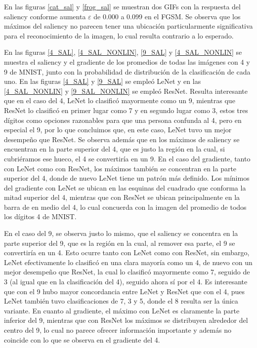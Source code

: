 En las figuras \ref{cat_sal} y \ref{frog_sal} se muestran dos GIFs con la respuesta del saliency conforme aumenta $\varepsilon$ de 0.000 a 0.099 en el FGSM. Se observa que los máximos del saliency no parecen tener una ubicación particularmente significativa para el reconocimiento de la imagen, lo cual resulta contrario a lo esperado.

En las figuras \ref{4_SAL}, \ref{4_SAL_NONLIN}, \ref{9_SAL} y \ref{4_SAL_NONLIN} se muestra el saliency y el gradiente de los promedios de todas las imágenes con 4 y 9 de MNIST, junto con la probabilidad de distribución de la clasificación de cada uno. En las figuras \ref{4_SAL} y \ref{9_SAL} se empleó LeNet y en las \ref{4_SAL_NONLIN} y \ref{9_SAL_NONLIN} se empleó ResNet. Resulta interesante que en el caso del 4, LeNet lo clasificó mayormente como un 9, mientras que ResNet lo clasificó en primer lugar como 7 y en segundo lugar como 3, estos tres dígitos como opciones razonables para que una persona confunda al 4, pero en especial el 9, por lo que concluimos que, en este caso, LeNet tuvo un mejor desempeño que ResNet. Se observa además que en los máximos de saliency se encuentran en la parte superior del 4, que es justo la región en la cual, si cubriéramos ese hueco, el 4 se convertiría en un 9. En el caso del gradiente, tanto con LeNet como con ResNet, los máximos también se concentran en la parte superior del 4, donde de nuevo LeNet tiene un patrón más definido. Los mínimos del gradiente con LeNet se ubican en las esquinas del cuadrado que conforma la mitad superior del 4, mientras que con ResNet se ubican principalmente en la barra de en medio del 4, lo cual concuerda con la imagen del promedio de todos los dígitos 4 de MNIST.

En el caso del 9, se observa justo lo mismo, que el saliency se concentra en la parte superior del 9, que es la región en la cual, al remover esa parte, el 9 se convertiría en un 4. Esto ocurre tanto con LeNet como con ResNet, sin embargo, LeNet efectivamente lo clasificó en una clara mayoría como un 4, de nuevo con un mejor desempeño que ResNet, la cual lo clasificó mayormente como 7, seguido de 3 (al igual que en la clasificación del 4), seguido ahora sí por el 4. Es interesante que con el 9 hubo mayor concordancia entre LeNet y ResNet que con el 4, pues LeNet también tuvo clasificaciones de 7, 3 y 5, donde el 8 resulta ser la única variante. En cuanto al gradiente, el máximo con LeNet es claramente la parte inferior del 9, mientras que con ResNet los máximos se distribuyen alrededor del centro del 9, lo cual no parece ofrecer información importante y además no coincide con lo que se observa en el gradiente del 4.